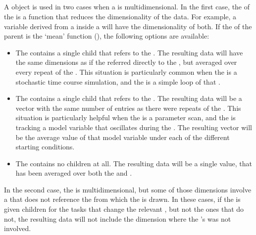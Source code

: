 \begin{blockChanged}
\subsection{}
\label{class:remainingDimension}
\label{class:listOfRemainingDimensions}

A \RemainingDimension object is used in two cases when a \Variable is multidimensional.  In the first case, the  of the \Variable is a function that reduces the dimensionality of the data.  For example, a variable derived from a \Task inside a \RepeatedTask will have the dimensionality of both.  If the  of the parent \Variable is the `mean' function (), the following options are available:

\begin{itemize}
        \item The \Variable contains a single \RemainingDimension child that refers to the \Task.  The resulting data will have the same dimensions as if the \Variable referred directly to the \Task, but averaged over every repeat of the \RepeatedTask.  This situation is particularly common when the \Task is a stochastic time course simulation, and the \RepeatedTask is a simple loop of that \Task.
        \item The \Variable contains a single \RemainingDimension child that refers to the \RepeatedTask.  The resulting data will be a vector with the same number of entries as there were repeats of the \RepeatedTask.  This situation is particularly helpful when the \RepeatedTask is a parameter scan, and the \Variable is tracking a model variable that oscillates during the \Task.  The resulting vector will be the average value of that model variable under each of the different starting conditions.
        \item The \Variable contains no \RemainingDimension children at all.  The resulting data will be a single value, that has been averaged over both the \Task and \RepeatedTask.
\end{itemize}

In the second case, the \Variable is multidimensional, but some of those dimensions involve a \Task that does not reference the \Model from which the \Variable is drawn.  In these cases, if the \Variable is given \RemainingDimension children for the tasks that change the relevant \Model, but not the ones that do not, the resulting data will not include the dimension where the \Variable's \Model was not involved.



\end{blockChanged}
